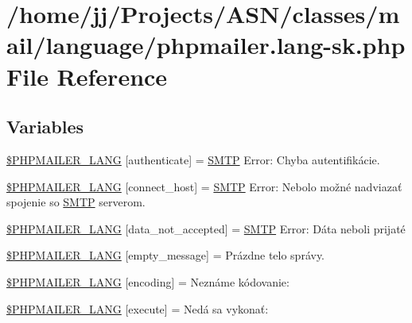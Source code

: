 \hypertarget{phpmailer_8lang-sk_8php}{}\section{/home/jj/\+Projects/\+A\+S\+N/classes/mail/language/phpmailer.lang-\/sk.php File Reference}
\label{phpmailer_8lang-sk_8php}
\subsection*{Variables}
\begin{DoxyCompactItemize}
\item 
\hyperlink{phpmailer_8lang-sk_8php_a2cb33073c989b85580748e331ed8b4aa}{\$\+P\+H\+P\+M\+A\+I\+L\+E\+R\+\_\+\+L\+A\+NG} \mbox{[}\textquotesingle{}authenticate\textquotesingle{}\mbox{]} = \textquotesingle{}\hyperlink{class_s_m_t_p}{S\+M\+TP} Error\+: Chyba autentifikácie.\textquotesingle{}
\item 
\hyperlink{phpmailer_8lang-sk_8php_a2ee0cc637a06b96e45600db31c6799ee}{\$\+P\+H\+P\+M\+A\+I\+L\+E\+R\+\_\+\+L\+A\+NG} \mbox{[}\textquotesingle{}connect\+\_\+host\textquotesingle{}\mbox{]} = \textquotesingle{}\hyperlink{class_s_m_t_p}{S\+M\+TP} Error\+: Nebolo možné nadviazať spojenie so \hyperlink{class_s_m_t_p}{S\+M\+TP} serverom.\textquotesingle{}
\item 
\hyperlink{phpmailer_8lang-sk_8php_a814c6b191205d2361b3233e9c9d6fda5}{\$\+P\+H\+P\+M\+A\+I\+L\+E\+R\+\_\+\+L\+A\+NG} \mbox{[}\textquotesingle{}data\+\_\+not\+\_\+accepted\textquotesingle{}\mbox{]} = \textquotesingle{}\hyperlink{class_s_m_t_p}{S\+M\+TP} Error\+: Dáta neboli prijaté\textquotesingle{}
\item 
\hyperlink{phpmailer_8lang-sk_8php_a33772099f637c9d6c2cd7425e0e37fed}{\$\+P\+H\+P\+M\+A\+I\+L\+E\+R\+\_\+\+L\+A\+NG} \mbox{[}\textquotesingle{}empty\+\_\+message\textquotesingle{}\mbox{]} = \textquotesingle{}Prázdne telo správy.\textquotesingle{}
\item 
\hyperlink{phpmailer_8lang-sk_8php_a817f7283f3d54c970a0c10305cc668cc}{\$\+P\+H\+P\+M\+A\+I\+L\+E\+R\+\_\+\+L\+A\+NG} \mbox{[}\textquotesingle{}encoding\textquotesingle{}\mbox{]} = \textquotesingle{}Neznáme kódovanie\+: \textquotesingle{}
\item 
\hyperlink{phpmailer_8lang-sk_8php_a668217a9563a168f30f2a8548b6ed5a9}{\$\+P\+H\+P\+M\+A\+I\+L\+E\+R\+\_\+\+L\+A\+NG} \mbox{[}\textquotesingle{}execute\textquotesingle{}\mbox{]} = \textquotesingle{}Nedá sa vykonať\+: \textquotesingle{}

\end{DoxyCompactItemize}
